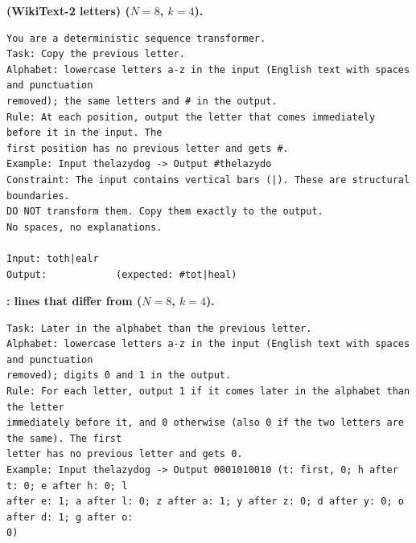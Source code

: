 \par\medskip\noindent\textbf{ (WikiText-2 letters) ($N = 8$, $k = 4$).}\par
\begin{small}
\begin{verbatim}
You are a deterministic sequence transformer.
Task: Copy the previous letter.
Alphabet: lowercase letters a-z in the input (English text with spaces and punctuation
removed); the same letters and # in the output.
Rule: At each position, output the letter that comes immediately before it in the input. The
first position has no previous letter and gets #.
Example: Input thelazydog -> Output #thelazydo
Constraint: The input contains vertical bars (|). These are structural boundaries.
DO NOT transform them. Copy them exactly to the output.
No spaces, no explanations.

Input: toth|ealr
Output:            (expected: #tot|heal)
\end{verbatim}
\end{small}

\par\medskip\noindent\textbf{: lines that differ from  ($N = 8$, $k = 4$).}\par
\begin{small}
\begin{verbatim}
Task: Later in the alphabet than the previous letter.
Alphabet: lowercase letters a-z in the input (English text with spaces and punctuation
removed); digits 0 and 1 in the output.
Rule: For each letter, output 1 if it comes later in the alphabet than the letter
immediately before it, and 0 otherwise (also 0 if the two letters are the same). The first
letter has no previous letter and gets 0.
Example: Input thelazydog -> Output 0001010010 (t: first, 0; h after t: 0; e after h: 0; l
after e: 1; a after l: 0; z after a: 1; y after z: 0; d after y: 0; o after d: 1; g after o:
0)
\end{verbatim}
\end{small}

